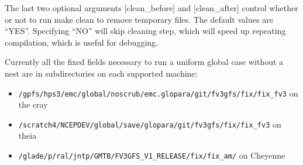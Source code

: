 The last two optional arguments [clean\_before] and [clean\_after] control whether or not to run
make clean to remove temporary files. The default values are “YES”. Specifying “NO” will skip
cleaning step, which will speed up repeating compilation, which is useful for debugging.

Currently all the fixed fields necessary to run a uniform global case without a nest are in subdirectories
on each supported machine:

\begin{itemize}
  \item[] \verb|/gpfs/hps3/emc/global/noscrub/emc.glopara/git/fv3gfs/fix/fix_fv3| on the cray
  \item[] \verb|/scratch4/NCEPDEV/global/save/glopara/git/fv3gfs/fix/fix_fv3| on theia
  \item[] \verb|/glade/p/ral/jntp/GMTB/FV3GFS_V1_RELEASE/fix/fix_am/| on Cheyenne
\end{itemize}

